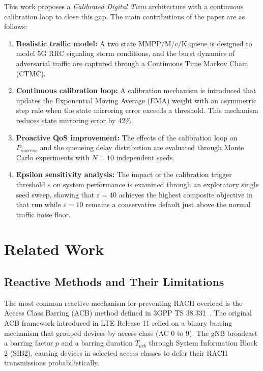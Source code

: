 \documentclass[conference]{IEEEtran}
\begin{document}
This work proposes a \emph{Calibrated Digital Twin} architecture with a continuous calibration loop to close this gap. The main contributions of the paper are as follows:

\begin{enumerate}
\item \textbf{Realistic traffic model:} A two state MMPP/M/c/K queue is designed to model 5G RRC signaling storm conditions, and the burst dynamics of adversarial traffic are captured through a Continuous Time Markov Chain (CTMC).
\item \textbf{Continuous calibration loop:} A calibration mechanism is introduced that updates the Exponential Moving Average (EMA) weight with an asymmetric step rule when the state mirroring error exceeds a threshold. This mechanism reduces state mirroring error by 42\%.
\item \textbf{Proactive QoS improvement:} The effects of the calibration loop on $P_{success}$ and the queueing delay distribution are evaluated through Monte Carlo experiments with $N=10$ independent seeds.
\item \textbf{Epsilon sensitivity analysis:} The impact of the calibration trigger threshold $\varepsilon$ on system performance is examined through an exploratory single seed sweep, showing that $\varepsilon = 40$ achieves the highest composite objective in that run while $\varepsilon = 10$ remains a conservative default just above the normal traffic noise floor.
\end{enumerate}

\section{Related Work}

\subsection{Reactive Methods and Their Limitations}

The most common reactive mechanism for preventing RACH overload is the Access Class Barring (ACB) method defined in 3GPP TS 38.331~\cite{b4}. The original ACB framework introduced in LTE Release 11 relied on a binary barring mechanism that grouped devices by access class (AC 0 to 9). The gNB broadcast a barring factor $p$ and a barring duration $T_{acb}$ through System Information Block 2 (SIB2), causing devices in selected access classes to defer their RACH transmissions probabilistically.
\end{document}
